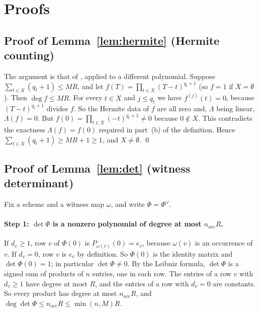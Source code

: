\documentclass[11pt,a4paper]{article}
\theoremstyle{definition}
\theoremstyle{remark}
\newcommand{\nocc}{n_{\mathrm{occ}}}
\begin{document}
\section{Proofs}\label{sec:proofs}

\subsection{Proof of Lemma~\ref{lem:hermite} (Hermite counting)}

The argument is that of \cite[Lemma~6.2]{DL}, applied to a different polynomial. Suppose
$\sum_{t\in X}(q_t+1)\le MR$, and let $f(T)=\prod_{t\in X}(T-t)^{q_t+1}$ (so $f=1$ if
$X=\emptyset$). Then $\deg f\le MR$. For every $t\in X$ and $j\le q_t$ we have
$f^{(j)}(t)=0$, because $(T-t)^{q_t+1}$ divides $f$. So the Hermite data of $f$ are all zero
and, $\Lambda$ being linear, $\Lambda(f)=0$. But
$f(0)=\prod_{t\in X}(-t)^{q_t+1}\ne0$ because $0\notin X$. This contradicts the exactness
$\Lambda(f)=f(0)$ required in part~(b) of the definition. Hence
$\sum_{t\in X}(q_t+1)\ge MR+1\ge1$, and $X\ne\emptyset$. \qed

\subsection{Proof of Lemma~\ref{lem:det} (witness determinant)}

Fix a scheme and a witness map $\omega$, and write $\Phi=\Phi^\omega$.

\paragraph{Step 1: $\det\Phi$ is a nonzero polynomial of degree at most $\nocc R$.} If
$d_v\ge1$, row $v$ of $\Phi(0)$ is $P_{\omega(v)}(0)=e_v$, because $\omega(v)$ is an
occurrence of $v$. If $d_v=0$, row $v$ is $e_v$ by definition. So $\Phi(0)$ is the identity
matrix and $\det\Phi(0)=1$; in particular $\det\Phi\ne0$. By the Leibniz formula, $\det\Phi$
is a signed sum of products of $n$ entries, one in each row. The entries of a row $v$ with
$d_v\ge1$ have degree at most $R$, and the entries of a row with $d_v=0$ are constants. So
every product has degree at most $\nocc R$, and $\deg\det\Phi\le\nocc R\le\min(n,M)R$.
\end{document}
